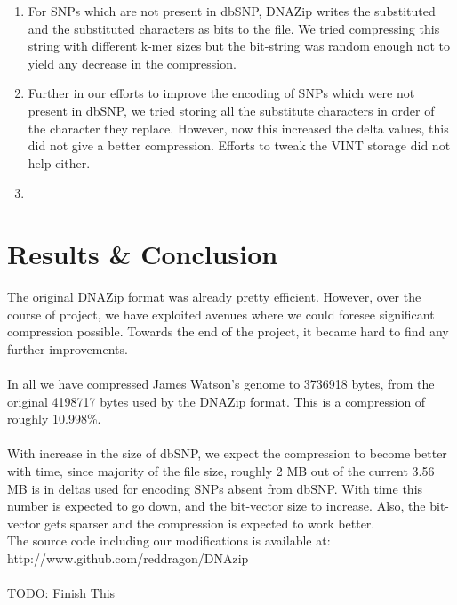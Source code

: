 \documentclass{article}
\begin{document}
\begin{enumerate}

\item For SNPs which are not present in dbSNP, DNAZip writes the substituted and
the substituted characters as bits to the file. We tried compressing this string
with different k-mer sizes but the bit-string was random enough not to yield 
any decrease in the compression.

\item Further in our efforts to improve the encoding of SNPs which were not present
in dbSNP, we tried storing all the substitute characters in order of the character they
replace. However, now this increased the delta values, this did not give a better 
compression. Efforts to tweak the VINT storage did not help either.

\item

\end{enumerate}

\clearpage

\section {Results \& Conclusion}
The original DNAZip format was already pretty efficient. However, over the course of project, we have exploited avenues where we could foresee significant compression possible. Towards the end of the project, it became hard to find any further improvements.\\
\\
In all we have compressed James Watson's genome to 3736918 bytes, from the original 4198717 bytes used by the DNAZip format. This is a compression of roughly 10.998\%. \\
\\
With increase in the size of dbSNP, we expect the compression to become better
with time, since majority of the file size, roughly 2 MB out of the current 
3.56 MB is in deltas used for encoding SNPs absent from dbSNP. With time
this number is expected to go down, and the bit-vector size to increase. Also,
the bit-vector gets sparser and the compression is expected to work better.
\\
The source code including our modifications is available at: \\
http://www.github.com/reddragon/DNAzip\\
\\
TODO: Finish This
\clearpage
\end{document}
